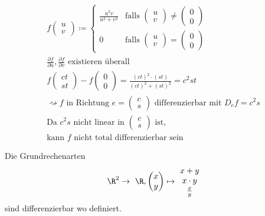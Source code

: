 \begin{bsp*}
	\begin{gather*}
		f\begin{pmatrix} u \\ v \end{pmatrix} \coloneqq \begin{cases}
			\frac{u^2 v}{u^2 + v^2}	&\text{falls } \begin{pmatrix} u \\ v \end{pmatrix} \neq \begin{pmatrix} 0 \\ 0 \end{pmatrix}	\\
			0				&\text{falls } \begin{pmatrix} u \\ v \end{pmatrix} = \begin{pmatrix} 0 \\ 0 \end{pmatrix}		
		\end{cases} \\
		\frac{\partial f}{\partial u} , \frac{\partial f}{\partial v} \text{ existieren überall} \\
		f\begin{pmatrix} ct \\ st \end{pmatrix} - f\begin{pmatrix} 0 \\ 0 \end{pmatrix} = \frac{(ct)^2 \cdot (st)}{(ct)^2 + (st)^2} = c^2 s t \\
		\rightsquigarrow f \text{ in Richtung } e = \begin{pmatrix} c \\ s \end{pmatrix} \text{ differenzierbar mit  } D_e f = c^2 s \\
		\text{Da $c^2 s$ nicht linear in } \begin{pmatrix} c \\ s \end{pmatrix} \text{ ist,} \\
		\text{kann $f$ nicht total differenzierbar sein}
	\end{gather*}
\end{bsp*}
\begin{fakt}
	Die Grundrechenarten
	\[ \R^2 \rightarrow \R , \begin{pmatrix} x \\ y \end{pmatrix} \mapsto \begin{matrix} x + y \\ x \cdot y \\ \frac{x}{y} \end{matrix} \]
	sind differenzierbar wo definiert.
\end{fakt}
